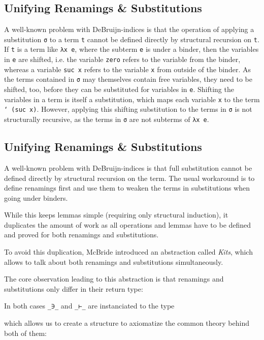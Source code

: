 \documentclass[sigplan,10pt]{acmart}
\newenvironment{LibCode*}{%
  \begin{tcolorbox}[%
    colframe=white,%
    boxrule=0.0pt,%
    top=2.5pt,%
    left=2.5pt,%
    bottom=2.5pt,%
    right=2.5pt,%
    boxsep=0pt%
  ]\vspace{-0.2\baselineskip}%
}{%
  \vspace{-1\baselineskip}%
  \end{tcolorbox}%
}
\newenvironment{ExampleCode*}{%
  \begin{tcolorbox}[%
    colframe=white,%
    colback=yellow!5,%
    boxrule=0.0pt,%
    top=2.5pt,%
    left=2.5pt,%
    bottom=2.5pt,%
    right=2.5pt,%
    boxsep=0pt%
  ]\vspace{-0.2\baselineskip}%
}{%
  \vspace{-1\baselineskip}%
  \end{tcolorbox}%
}
\newcommand*\LibCode[1]{\begin{LibCode*}{#1}\end{LibCode*}}
\newcommand*\ExampleCode[1]{\begin{ExampleCode*}{#1}\end{ExampleCode*}}
\begin{document}
  \subsection{Unifying Renamings \& Substitutions}
  A well-known problem with DeBruijn-indices is that the operation of
  applying a substitution \texttt{σ} to a term \texttt{t} cannot be
  defined directly by structural recursion on \texttt{t}.
  If \texttt{t} is a term like \texttt{λx e},
  where the subterm \texttt{e} is under a binder, then the variables
  in \texttt{e} are shifted, i.e.  the variable \texttt{zero} refers
  to the variable from the binder, whereas a variable \texttt{suc x}
  refers to the variable \texttt{x} from outside of the binder.
  As the terms contained in \texttt{σ} may themselves contain free variables,
  they need to be shifted, too, before they can be substituted
  for variables in \texttt{e}. 
  Shifting the variables in a term is itself a substitution, which maps
  each variable \texttt{x} to the term \texttt{` (suc x)}.
  However, applying this shifting substitution to the terms in
  \texttt{σ} is not structurally recursive, as the terms in \texttt{σ}
  are not subterms of \texttt{λx e}.


  \subsection{Unifying Renamings \& Substitutions}
  A well-known problem with DeBruijn-indices is that full substitution
  cannot be defined directly by structural recursion on the term.
  The usual workaround is to define renamings first and use them
  to weaken the terms in substitutions when going under binders.

  While this keeps lemmas simple (requiring only structural induction),
  it duplicates the amount of work as all operations and lemmas have
  to be defined and proved for both renamings and substitutions.

  To avoid this duplication,
  McBride\cite{DBLP:journals/jar/BentonHKM12, unpublished:mcbride2005kits}
  introduced an abstraction called \emph{Kits}, which allows to talk about
  both renamings and substitutions simultaneously.

  The core observation leading to this abstraction is that renamings
  and substitutions only differ in their return type:
  \ExampleCode\FExampleSubRen

  In both cases \texttt{\_∋\_} and \texttt{\_⊢\_} are instanciated to the type
  \LibCode\KScoped
  which allows us to create a structure to axiomatize the common
  theory behind both of them:
  \LibCode\KKit
\end{document}
